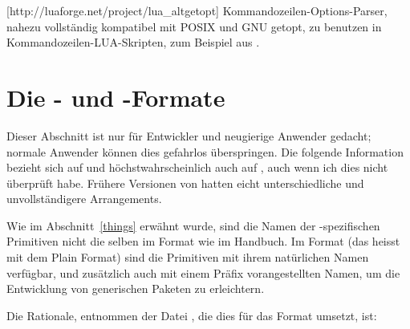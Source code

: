 \documentclass{lltxdoc}
\begin{document}
[http://luaforge.net/project/lua_altgetopt]
Kommandozeilen-Options-Parser, nahezu vollständig kompatibel mit POSIX und GNU 
getopt, zu benutzen in Kommandozeilen-LUA-Skripten, zum Beispiel 
 aus .


\section{Die  - und -Formate}\label{formats}

Dieser Abschnitt ist nur für Entwickler und neugierige Anwender gedacht; 
normale Anwender können dies gefahrlos überspringen. Die folgende Information 
bezieht sich auf  und höchstwahrscheinlich auch auf , 
auch wenn ich dies nicht überprüft habe. Frühere Versionen von \texlive hatten 
eicht unterschiedliche und unvollständigere Arrangements.

Wie im Abschnitt~\ref{things} erwähnt wurde, sind die Namen der 
\luatex-spezifischen Primitiven nicht die selben im  Format wie 
im \luatex Handbuch. Im  Format (das heisst \luatex mit dem Plain 
Format) sind die Primitiven mit ihrem natürlichen Namen verfügbar, und 
zusätzlich auch mit einem Präfix vorangestellten Namen, um die Entwicklung von 
generischen Paketen zu erleichtern.

Die Rationale, entnommen der Datei  , die dies für 
das  Format umsetzt, ist:
\end{document}
